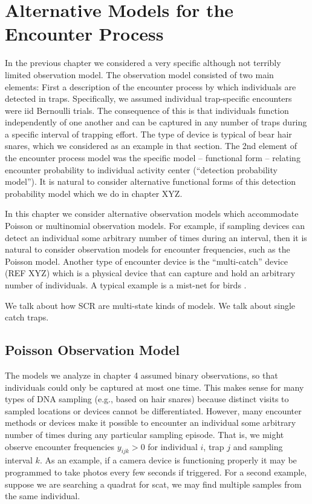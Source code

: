\chapter{Alternative Models for the Encounter Process}

In the previous chapter we considered a very specific although not
terribly limited observation model. The observation model consisted of
two main elements: First a description of the encounter process 
by which individuals are detected in traps. Specifically, we 
assumed individual trap-specific encounters were iid Bernoulli
trials. The consequence of this is that individuals function
independently of one another and can be captured in
any number of traps during a specific interval of trapping
effort. The type of device is typical of bear hair snares, which we
considered as an example in that section. The 2nd element of the
encounter process model was the specific model – functional form –
relating encounter probability to individual activity center
(``detection probability model'').  It is natural to consider
alternative functional forms of this detection probability model which
we do in chapter XYZ.

In
this chapter we consider alternative observation models which
accommodate Poisson or multinomial observation models. For example, if
sampling devices can detect an individual some arbitrary number of
times during an interval, then it is natural to consider observation
models for encounter frequencies, such as the Poisson model. Another
type of encounter device is the “multi-catch” device (REF XYZ) which
is a physical device that can capture and hold an arbitrary number of
individuals. A typical example is a mist-net for birds 
\citep{borchers_efford:2008}.

We talk about how SCR are multi-state kinds of models. 
We talk about single catch traps. 


\section{Poisson Observation Model}

The models we analyze in chapter 4 assumed binary observations, so
that individuals could only be captured at most one time.  This makes
sense for many types of DNA sampling (e.g., based on hair snares)
because distinct visits to sampled locations or devices cannot be
differentiated. However, many encounter methods or devices make it
possible to encounter an individual some arbitrary number of times
during any particular sampling episode. That is, we might observe
encounter frequencies $y_{ijk}>0$ for individual $i$, trap $j$ and
sampling interval $k$.  As an example, if a camera device is
functioning properly it may be programmed to take photos every few
seconds if triggered.  For a second example, suppose we are searching
a quadrat for scat, we may find multiple samples from the same
individual.

